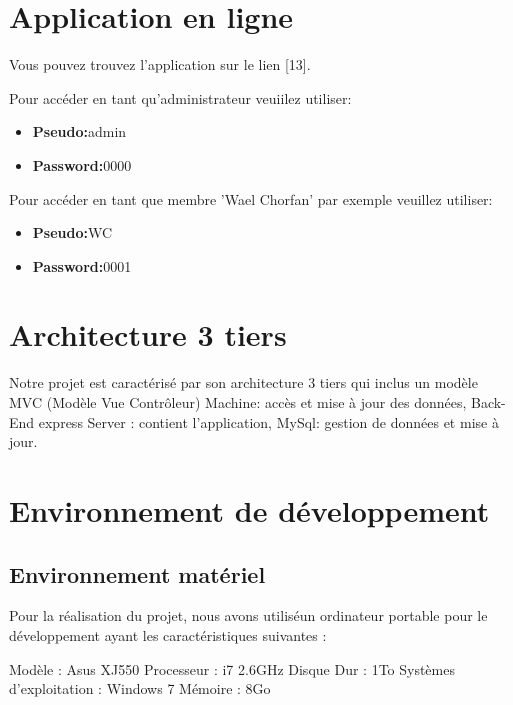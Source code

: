 \section{Application en ligne}
Vous pouvez trouvez l'application sur le lien [13].


  Pour acc\'{e}der en tant qu'administrateur veuiilez utiliser:

  \begin{itemize}
    \item {\textbf{ Pseudo:}admin}
    \item {\textbf{ Password:}0000}
  \end{itemize}


  Pour acc\'{e}der en tant que membre 'Wael Chorfan' par exemple veuillez utiliser:

  \begin{itemize}
    \item {\textbf{ Pseudo:}WC}
    \item {\textbf{ Password:}0001}
  \end{itemize}

 \newpage



 \section{ Architecture 3 tiers}

Notre projet est caract\'{e}ris\'{e} par son architecture 3 tiers qui inclus un mod\`{e}le MVC (Mod\`{e}le
Vue Contr\^{o}leur)
\textbullet{} Machine: acc\`{e}s et mise \`{a} jour des donn\'{e}es,
\textbullet{} Back-End express Server : contient l'application,
\textbullet{} MySql: gestion de donn\'{e}es et mise \`{a} jour.


\section{Environnement de d\'{e}veloppement}

  \subsection{Environnement mat\'{e}riel }

  Pour la r\'{e}alisation du projet, nous avons utilis\'{e}un ordinateur
  portable pour le d\'{e}veloppement ayant les caract\'{e}ristiques suivantes :

\textbullet{} Mod\`{e}le : Asus XJ550 \newline
\textbullet{} Processeur : i7 2.6GHz \newline
\textbullet{} Disque Dur : 1To  \newline
\textbullet{} Syst\`{e}mes d'exploitation : Windows 7  \newline
\textbullet{} M\'{e}moire : 8Go  \newline


